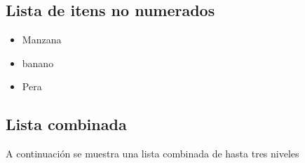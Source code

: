 \documentclass{article}
\begin{document}
\subsection{Lista de itens no numerados}

\begin{itemize}
	\item Manzana
	\item banano
	\item Pera
\end{itemize}

\subsection{Lista combinada}

A continuación se muestra una lista combinada de hasta tres niveles
\end{document}
